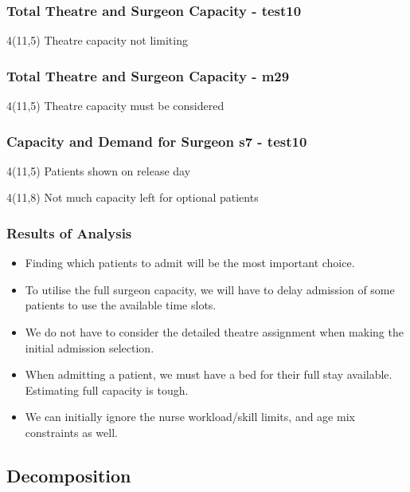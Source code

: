 \begin{frame}
\frametitle{Total Theatre and Surgeon Capacity - test10}
\scalebox{0.6}{

}
 \begin{textblock}{4}(11,5)
  Theatre capacity not limiting
 \end{textblock}
\end{frame}

\begin{frame}
\frametitle{Total Theatre and Surgeon Capacity - m29}
\scalebox{0.6}{

}
 \begin{textblock}{4}(11,5)
  Theatre capacity must be considered
 \end{textblock}
\end{frame}

\begin{frame}
\frametitle{Capacity and Demand for Surgeon s7 - test10}
\scalebox{0.6}{

}
 \begin{textblock}{4}(11,5)
  Patients shown on release day
 \end{textblock}
 \begin{textblock}{4}(11,8)
  Not much capacity left for optional patients
 \end{textblock}
\end{frame}

\begin{frame}
\frametitle{Results of Analysis}
\begin{itemize}
\item Finding which patients to admit will be the most important choice. 
\item To utilise the full surgeon capacity, we will have to delay admission of some patients to use the available time  slots.
\item We do  not have to consider the detailed theatre assignment when making the initial admission selection.
\item When admitting a patient, we must have a bed for their full stay available. Estimating full capacity is tough.
\item We can initially ignore the nurse workload/skill limits, and age mix constraints as well.
\end{itemize}
\end{frame}

\subsection{Decomposition}

